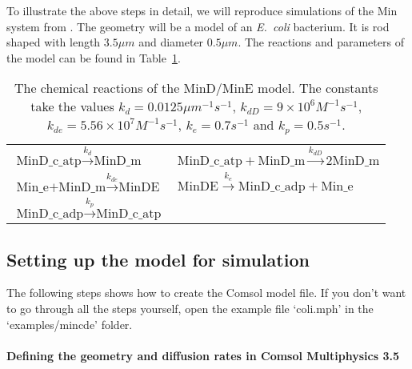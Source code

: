 To illustrate the above steps in detail, we will reproduce simulations
of the Min system from \cite{MinD}. The geometry will be a model of an
\emph{E.~coli} bacterium. It is rod shaped with length $3.5\mu m$ and
diameter $0.5\mu m$. The reactions and parameters of the model can be
found in Table\ \ref{tab:MinD}.

\begin{table}[htp]
\centering
\begin{tabular}{ll}
  $\mbox{MinD\_c\_atp} \xrightarrow{k_d} \mbox{MinD\_m}$ & 
  $\mbox{MinD\_c\_atp}+\mbox{MinD\_m} \xrightarrow{k_{dD}} \mbox{2MinD\_m} $ \\
  $\mbox{Min\_e+MinD\_m} \xrightarrow{k_{de}} \mbox{MinDE}$ & 
  $\mbox{MinDE} \xrightarrow{k_e} \mbox{MinD\_c\_adp} + \mbox{Min\_e} $ \\
  $\mbox{MinD\_c\_adp} \xrightarrow{k_p} \mbox{MinD\_c\_atp}$
 \end{tabular} 
  \caption{The chemical reactions of the MinD/MinE model. The
    constants take the values $k_d = 0.0125\mu m^{-1}s^{-1}$, $k_{dD}
    = 9 \times 10^6 M^{-1}s^{-1}$, $k_{de} = 5.56\times 10^7
    M^{-1}s^{-1}$, $k_e=0.7s^{-1}$ and $k_p = 0.5s^{-1}$.}
  \label{tab:MinD}
\end{table}

\subsection{Setting up the model for simulation}

The following steps shows how to create the Comsol model file. If you
don't want to go through all the steps yourself, open the example file
`coli.mph' in the `examples/mincde' folder.

\paragraph*{Defining the geometry and diffusion rates in Comsol Multiphysics 3.5}

